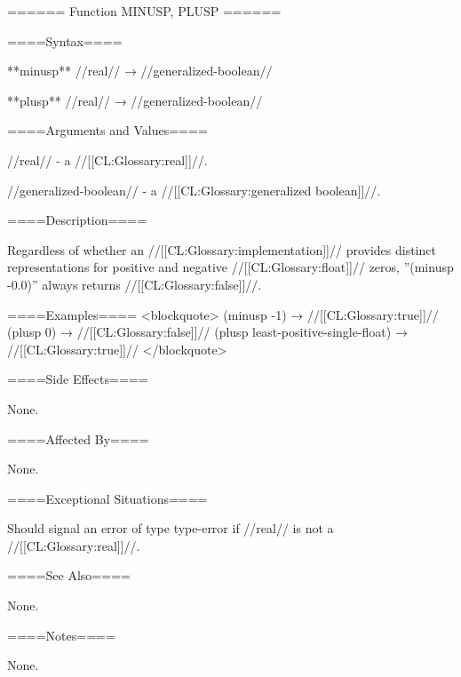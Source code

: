 ====== Function MINUSP, PLUSP ======

====Syntax====

**minusp** //real// → //generalized-boolean//

**plusp** //real// → //generalized-boolean//

====Arguments and Values====

//real// - a //[[CL:Glossary:real]]//.

//generalized-boolean// - a //[[CL:Glossary:generalized boolean]]//.

====Description====



Regardless of whether an //[[CL:Glossary:implementation]]// provides distinct representations for positive and negative //[[CL:Glossary:float]]// zeros, ''(minusp -0.0)'' always returns //[[CL:Glossary:false]]//.

====Examples==== <blockquote> (minusp -1) → //[[CL:Glossary:true]]// (plusp 0) → //[[CL:Glossary:false]]// (plusp least-positive-single-float) → //[[CL:Glossary:true]]// </blockquote>

====Side Effects====

None.

====Affected By====

None.

====Exceptional Situations====

Should signal an error of type type-error if //real// is not a //[[CL:Glossary:real]]//.

====See Also====

None.

====Notes====

None.

